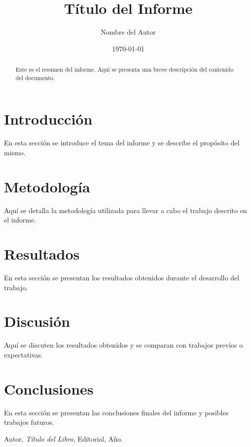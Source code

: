 \documentclass[a4paper,12pt]{article}
\title{Título del Informe}
\author{Nombre del Autor}
\date{\today}
\begin{document}
\maketitle

\begin{abstract}
    Este es el resumen del informe. Aquí se presenta una breve descripción del contenido del documento.
\end{abstract}

\tableofcontents

\section{Introducción}
En esta sección se introduce el tema del informe y se describe el propósito del mismo.

\section{Metodología}
Aquí se detalla la metodología utilizada para llevar a cabo el trabajo descrito en el informe.

\section{Resultados}
En esta sección se presentan los resultados obtenidos durante el desarrollo del trabajo.

\section{Discusión}
Aquí se discuten los resultados obtenidos y se comparan con trabajos previos o expectativas.

\section{Conclusiones}
En esta sección se presentan las conclusiones finales del informe y posibles trabajos futuros.

\begin{thebibliography}{9}
     Autor, \textit{Título del Libro}, Editorial, Año.
\end{thebibliography}
\end{document}
